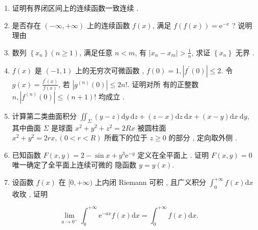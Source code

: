 \documentclass[10pt]{article}
\begin{document}
\begin{enumerate}
  \item  证明有界闭区间上的连续函数一致连续 .

  \item  是否存在  $(-\infty,+\infty)$  上的连续函数  $f(x)$,  满足  $f(f(x))=\mathrm{e}^{-x}$ ?  说明理由 

  \item  数列  $\left\{x_{n}\right\}(n \geqslant 1)$,  满足任意  $n<m$,  有  $\left|x_{n}-x_{m}\right|>\frac{1}{n}$,  求证  $\left\{x_{n}\right\}$  无界 .

  \item $f(x)$  是  $(-1,1)$  上的无穷次可微函数 , $f(0)=1,\left|f^{\prime}(0)\right| \leqslant 2$.  令  $g(x)=\frac{f^{\prime}(x)}{f(x)}$,  若  $\left|g^{(n)}(0)\right| \leqslant 2 n !$.  证明对所   有的正整数  $n,\left|f^{(n)}(0)\right| \leqslant(n+1) !$  均成立 .

  \item  计算第二类曲面积分  $\iint_{\Sigma}(y-z) \mathrm{d} y \mathrm{~d} z+(z-x) \mathrm{d} z \mathrm{~d} x+(x-y) \mathrm{d} x \mathrm{~d} y$,  其中曲面  $\Sigma$  是球面  $x^{2}+y^{2}+z^{2}=2 R x$  被圆柱面  $x^{2}+y^{2}=2 r x,(0<r<R)$  所截下的位于  $z \geqslant 0$  的部分 ,  定向取外侧 .

  \item  已知函数  $F(x, y)=2-\sin x+y^{3} \mathrm{e}^{-y}$  定义在全平面上 .  证明  $F(x, y)=0$  唯一确定了全平面上连续可微的   隐函数  $y=y(x)$.

  \item  设函数  $f(x)$  在  $[0,+\infty)$  上内闭  Riemann  可积 ,  且广义积分  $\int_{0}^{+\infty} f(x) \mathrm{d} x$  收玫 ,  证明 

\end{enumerate}
$$
\lim _{a \rightarrow 0^{+}} \int_{0}^{+\infty} \mathrm{e}^{-a x} f(x) \mathrm{d} x=\int_{0}^{+\infty} f(x) \mathrm{d} x .
$$
\end{document}
